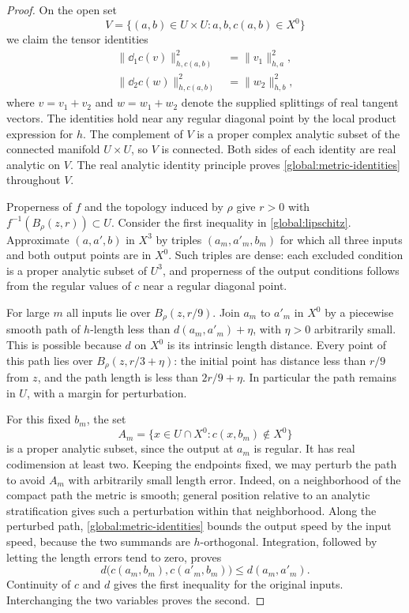 \begin{proof}
On the open set
\[
 V=\{(a,b)\in U\times U:a,b,c(a,b)\in X^0\}
\]
we claim the tensor identities
\begin{equation}\label{global:metric-identities}
 \begin{split}
 \bigl\lVert\dd_1c(v)\bigr\rVert_{h,c(a,b)}^2
     &=\lVert v_1\rVert_{h,a}^2,\\
 \bigl\lVert\dd_2c(w)\bigr\rVert_{h,c(a,b)}^2
     &=\lVert w_2\rVert_{h,b}^2,
 \end{split}
\end{equation}
where $v=v_1+v_2$ and $w=w_1+w_2$ denote the supplied splittings of real
tangent vectors.  The identities hold near any regular diagonal point
by the local product expression for $h$.  The complement of $V$ is a
proper complex analytic subset of the connected manifold $U\times U$,
so $V$ is connected.  Both sides of each identity are real analytic on
$V$.  The real analytic identity principle proves
\eqref{global:metric-identities} throughout $V$.

Properness of $f$ and the topology induced by $\rho$ give $r>0$ with
$f^{-1}(B_{\rho}(z,r))\subset U$.  Consider the first inequality in
\eqref{global:lipschitz}.  Approximate $(a,a',b)$ in $X^3$ by triples
$(a_m,a'_m,b_m)$ for which all three inputs and both output points are in
$X^0$.  Such triples are dense: each excluded condition is a proper
analytic subset of $U^3$, and properness of the output conditions follows
from the regular values of $c$ near a regular diagonal point.

For large $m$ all inputs lie over $B_{\rho}(z,r/9)$.  Join $a_m$ to $a'_m$
in $X^0$ by a piecewise smooth path of $h$-length less than
$d(a_m,a'_m)+\eta$, with $\eta>0$ arbitrarily small.  This is possible
because $d$ on $X^0$ is its intrinsic length distance.  Every point of
this path lies over $B_{\rho}(z,r/3+\eta)$: the initial point has distance
less than $r/9$ from $z$, and the path length is less than $2r/9+\eta$.
In particular the path remains in $U$, with a margin for perturbation.

For this fixed $b_m$, the set
\[
 A_m=\{x\in U\cap X^0:c(x,b_m)\notin X^0\}
\]
is a proper analytic subset, since the output at $a_m$ is regular.
It has real codimension at least two.  Keeping the endpoints fixed, we
may perturb the path to avoid $A_m$ with arbitrarily small length error.
Indeed, on a neighborhood of the compact path the metric is smooth;
general position relative to an analytic stratification gives such a
perturbation within that neighborhood.  Along the perturbed path,
\eqref{global:metric-identities} bounds the output speed by the input
speed, because the two summands are $h$-orthogonal.  Integration, followed
by letting the length errors tend to zero, proves
\[
 d\bigl(c(a_m,b_m),c(a'_m,b_m)\bigr)\leq d(a_m,a'_m).
\]
Continuity of $c$ and $d$ gives the first inequality for the original
inputs.  Interchanging the two variables proves the second.
\end{proof}

